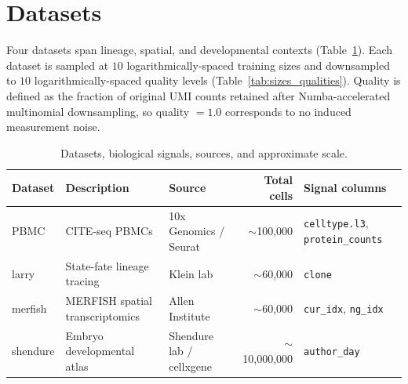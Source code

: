 \documentclass{article}
\begin{document}
\section{Datasets}

Four datasets span lineage, spatial, and developmental contexts (Table~\ref{tab:datasets}). Each dataset is sampled at $10$ logarithmically-spaced training sizes and downsampled to $10$ logarithmically-spaced quality levels (Table~\ref{tab:sizes_qualities}). Quality is defined as the fraction of original UMI counts retained after Numba-accelerated multinomial downsampling, so quality $=1.0$ corresponds to no induced measurement noise.

\begin{table}[!htbp]
\centering
\caption{Datasets, biological signals, sources, and approximate scale.}
\label{tab:datasets}
\small
\begin{tabular}{lllrl}
\toprule
\textbf{Dataset} & \textbf{Description} & \textbf{Source} & \textbf{Total cells} & \textbf{Signal columns} \\
\midrule
PBMC     & CITE-seq PBMCs              & 10x Genomics / Seurat       & $\sim$100{,}000     & \texttt{celltype.l3}, \texttt{protein\_counts} \\
larry    & State-fate lineage tracing  & Klein lab                   & $\sim$60{,}000      & \texttt{clone} \\
merfish  & MERFISH spatial transcriptomics & Allen Institute         & $\sim$60{,}000      & \texttt{cur\_idx}, \texttt{ng\_idx} \\
shendure & Embryo developmental atlas  & Shendure lab / cellxgene    & $\sim$10{,}000{,}000 & \texttt{author\_day} \\
\bottomrule
\end{tabular}
\end{table}
\end{document}
